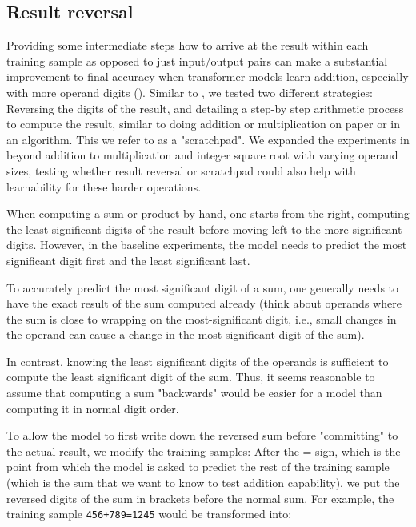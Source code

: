 \subsection{Result reversal}
\label{methods:reversal}

Providing some intermediate steps how to arrive at the result within each training sample as opposed to just input/output pairs can make a substantial improvement to final accuracy when transformer models learn addition, especially with more operand digits ().
Similar to \cite{teaching}, we tested two different strategies: Reversing the digits of the result, and detailing a step-by step arithmetic process to compute the result, similar to doing addition or multiplication on paper or in an algorithm. This we refer to as a "scratchpad". We expanded the experiments in \cite{teaching} beyond addition to multiplication and integer square root with varying operand sizes, testing whether result reversal or scratchpad could also help with learnability for these harder operations.

When computing a sum or product by hand, one starts from the right, computing the least significant digits of the result before moving left to the more significant digits. However, in the baseline experiments, the model needs to predict the most significant digit first and the least significant last.

To accurately predict the most significant digit of a sum, one generally needs to have the exact result of the sum computed already (think about operands where the sum is close to wrapping on the most-significant digit, i.e., small changes in the operand can cause a change in the most significant digit of the sum).

In contrast, knowing the least significant digits of the operands is sufficient to compute the least significant digit of the sum. Thus, it seems reasonable to assume that computing a sum "backwards" would be easier for a model than computing it in normal digit order.


To allow the model to first write down the reversed sum before "committing" to the actual result, we modify the training samples: After the = sign, which is the point from which the model is asked to predict the rest of the training sample (which is the sum that we want to know to test addition capability), we put the reversed digits of the sum in brackets before the normal sum.
For example, the training sample \verb!456+789=1245!
would be transformed into:


